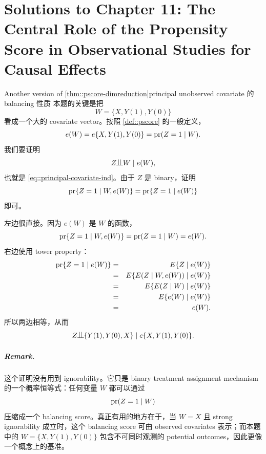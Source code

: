 \chapter{Solutions to Chapter 11: The Central Role of the Propensity Score in Observational Studies for Causal Effects}
\label{sol:chapter11}

\begin{exercisesolution}{Another version of \cref{thm::pscore-dimreduction}}{principal unobserved covariate 的 balancing 性质}
本题的关键是把
\[
W=\{X,Y(1),Y(0)\}
\]
看成一个大的 covariate vector。按照 \cref{def::pscore} 的一般定义，
\[
e(W)=e\{X,Y(1),Y(0)\}=\textup{pr}(Z=1\mid W).
\]
我们要证明
\[
Z\ind W\mid e(W),
\]
也就是 \cref{eq::principal-covariate-ind}。由于 $Z$ 是 binary，证明
\[
\textup{pr}\{Z=1\mid W,e(W)\}=\textup{pr}\{Z=1\mid e(W)\}
\]
即可。

左边很直接。因为 $e(W)$ 是 $W$ 的函数，
\[
\textup{pr}\{Z=1\mid W,e(W)\}
=\textup{pr}(Z=1\mid W)
=e(W).
\]
右边使用 tower property：
\begin{eqnarray*}
\textup{pr}\{Z=1\mid e(W)\}
&=&E\{Z\mid e(W)\}\\
&=&E\{E(Z\mid W,e(W))\mid e(W)\}\\
&=&E\{E(Z\mid W)\mid e(W)\}\\
&=&E\{e(W)\mid e(W)\}\\
&=&e(W).
\end{eqnarray*}
所以两边相等，从而
\[
Z\ind \{Y(1),Y(0),X\}\mid e\{X,Y(1),Y(0)\}.
\]

\paragraph{Remark.}
这个证明没有用到 ignorability。它只是 binary treatment assignment mechanism 的一个概率恒等式：任何变量 $W$ 都可以通过
\[
\textup{pr}(Z=1\mid W)
\]
压缩成一个 balancing score。真正有用的地方在于，当 $W=X$ 且 strong ignorability 成立时，这个 balancing score 可由 observed covariates 表示；而本题中的 $W=\{X,Y(1),Y(0)\}$ 包含不可同时观测的 potential outcomes，因此更像一个概念上的基准。
\end{exercisesolution}

